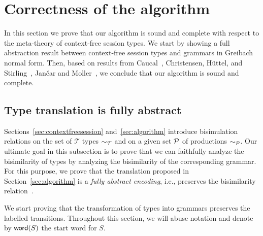 \section{Correctness of the algorithm}
\label{sec:correctness}

In this section we prove that our algorithm is sound and complete
with respect to the meta-theory of context-free session types.
%
We start by showing a full abstraction result between context-free
session types and grammars in Greibach normal form.
%
Then, based on results from Caucal~\cite{caucal1986decidabilite},
Christensen, H{\"{u}}ttel, and
Stirling~\cite{DBLP:journals/iandc/ChristensenHS95}, Jan{\v{c}}ar and
Moller~\cite{janvcar1999techniques}, we conclude that our algorithm is
sound and complete.

\subsection{Type translation is fully abstract}

Sections~\ref{sec:contextfreesession} and~\ref{sec:algorithm}
introduce bisimulation relations on the set of $\mathcal T$ types
$\sim_\mathcal T$ and on a given set $\mathcal P$ of productions
$\sim_\mathcal P$.  Our ultimate goal in this subsection is to prove that
we can faithfully analyze the bisimilarity of types by analyzing the
bisimilarity of the corresponding grammar. For this purpose, we prove
that the translation proposed in Section~\ref{sec:algorithm} is a
\emph{fully abstract encoding}, i.e., preserves the bisimilarity
relation~\cite{gorla2016full}.


We start proving that the transformation of types into grammars preserves
the labelled transitions. Throughout this section, we 
will abuse notation and denote by $\mathsf{word}(S)$ the start word for $S$.

